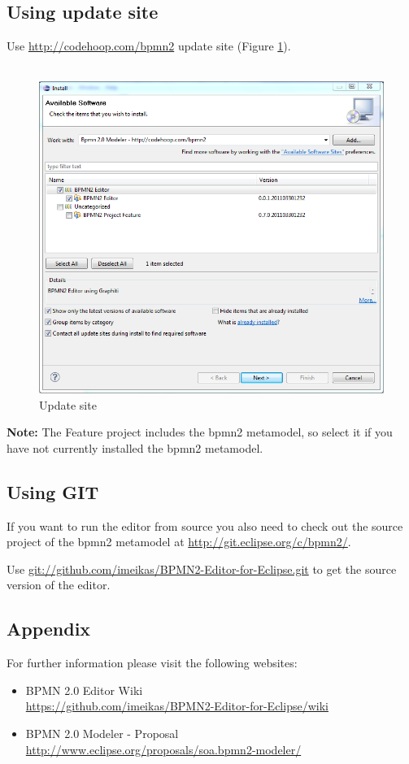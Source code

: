 \documentclass[a4paper]{scrreprt}
\begin{document}
\subsection{Using update site}
Use \url{http://codehoop.com/bpmn2} update site (Figure \ref{fig:updatesite.png}).\\ \\
\begin{figure}
	\centering	
	\includegraphics[scale=0.5]{images/updatesite.png}
	\caption{Update site}
	\label{fig:updatesite.png}
\end{figure}
\textbf{Note:} The Feature project includes the bpmn2 metamodel, so select it if you have not currently installed the bpmn2 metamodel. 

\subsection{Using GIT}
If you want to run the editor from source you also need to check out the source project of the bpmn2 metamodel at \url{http://git.eclipse.org/c/bpmn2/}.

Use \url{git://github.com/imeikas/BPMN2-Editor-for-Eclipse.git} to get the source version of the editor.

\subsection{Appendix}
For further information please visit the following websites:
\begin{itemize}
	\item BPMN 2.0 Editor Wiki \\ \url{https://github.com/imeikas/BPMN2-Editor-for-Eclipse/wiki}
	\item BPMN 2.0 Modeler - Proposal \\ \url{http://www.eclipse.org/proposals/soa.bpmn2-modeler/}
\end{itemize}
\end{document}

